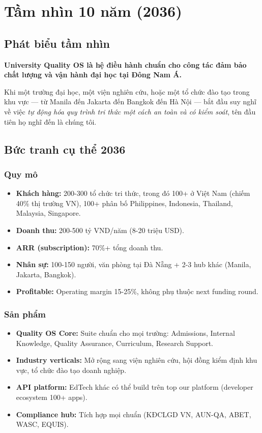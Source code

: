 \documentclass[11pt,a4paper]{article}
\begin{document}
\section{Tầm nhìn 10 năm (2036)}

\subsection{Phát biểu tầm nhìn}

\begin{visionbox}[title=Tầm nhìn 2036]
\textbf{University Quality OS là hệ điều hành chuẩn cho công tác đảm bảo chất
lượng và vận hành đại học tại Đông Nam Á.}

Khi một trường đại học, một viện nghiên cứu, hoặc một tổ chức đào tạo trong
khu vực --- từ Manila đến Jakarta đến Bangkok đến Hà Nội --- bắt đầu suy nghĩ
về việc \textit{tự động hóa quy trình tri thức một cách an toàn và có kiểm
soát}, tên đầu tiên họ nghĩ đến là chúng tôi.
\end{visionbox}

\subsection{Bức tranh cụ thể 2036}

\subsubsection*{Quy mô}
\begin{itemize}
\item \textbf{Khách hàng:} 200-300 tổ chức tri thức, trong đó 100+ ở Việt Nam (chiếm 40\% thị trường VN), 100+ phân bố Philippines, Indonesia, Thailand, Malaysia, Singapore.
\item \textbf{Doanh thu:} 200-500 tỷ VND/năm (8-20 triệu USD).
\item \textbf{ARR (subscription):} 70\%+ tổng doanh thu.
\item \textbf{Nhân sự:} 100-150 người, văn phòng tại Đà Nẵng + 2-3 hub khác (Manila, Jakarta, Bangkok).
\item \textbf{Profitable:} Operating margin 15-25\%, không phụ thuộc next funding round.
\end{itemize}

\subsubsection*{Sản phẩm}
\begin{itemize}
\item \textbf{Quality OS Core:} Suite chuẩn cho mọi trường: Admissions, Internal Knowledge, Quality Assurance, Curriculum, Research Support.
\item \textbf{Industry verticals:} Mở rộng sang viện nghiên cứu, hội đồng kiểm định khu vực, tổ chức đào tạo doanh nghiệp.
\item \textbf{API platform:} EdTech khác có thể build trên top our platform (developer ecosystem 100+ apps).
\item \textbf{Compliance hub:} Tích hợp mọi chuẩn (KĐCLGD VN, AUN-QA, ABET, WASC, EQUIS).
\end{itemize}
\end{document}

